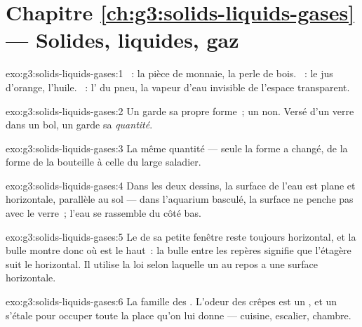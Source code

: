\section*{Chapitre \ref{ch:g3:solids-liquids-gases} --- Solides, liquides, gaz}

\begin{solution}{exo:g3:solids-liquids-gases:1}
~: la pièce de monnaie, la perle de bois. ~: le jus
d'orange, l'huile. ~: l' du pneu, la vapeur d'eau invisible de
l'espace transparent.
\end{solution}

\begin{solution}{exo:g3:solids-liquids-gases:2}
Un  garde sa propre forme~; un  non. Versé d'un verre
dans un bol, un  garde sa \emph{quantité}.
\end{solution}

\begin{solution}{exo:g3:solids-liquids-gases:3}
La même quantité --- seule la forme a changé, de la forme de la
bouteille à celle du large saladier.
\end{solution}

\begin{solution}{exo:g3:solids-liquids-gases:4}
Dans les deux dessins, la surface de l'eau est plane et horizontale,
parallèle au sol --- dans l'aquarium basculé, la surface ne penche
pas avec le verre~; l'eau se rassemble du côté bas.
\end{solution}

\begin{solution}{exo:g3:solids-liquids-gases:5}
Le  de sa petite fenêtre reste toujours horizontal, et la
bulle montre donc où est le haut~: la bulle entre les repères
signifie que l'étagère suit le  horizontal. Il utilise la loi
selon laquelle un  au repos a une surface horizontale.
\end{solution}

\begin{solution}{exo:g3:solids-liquids-gases:6}
La famille des . L'odeur des crêpes est un , et un  s'étale
pour occuper toute la place qu'on lui donne --- cuisine, escalier,
chambre.
\end{solution}

